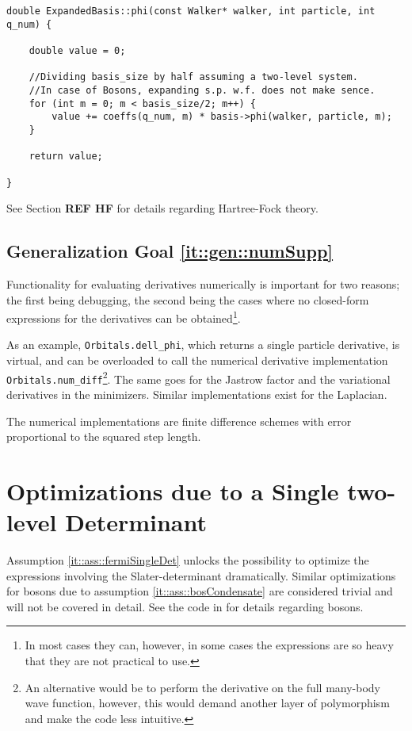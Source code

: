 \vspace{0.5cm}
\begin{lstlisting}
double ExpandedBasis::phi(const Walker* walker, int particle, int q_num) {

    double value = 0;
    
    //Dividing basis_size by half assuming a two-level system.
    //In case of Bosons, expanding s.p. w.f. does not make sence.
    for (int m = 0; m < basis_size/2; m++) {
        value += coeffs(q_num, m) * basis->phi(walker, particle, m);
    }

    return value;

}
\end{lstlisting}

See Section \textbf{REF HF} for details regarding Hartree-Fock theory.

\subsection{Generalization Goal \ref{it::gen::numSupp}}

Functionality for evaluating derivatives numerically is important for two reasons; the first being debugging, the second being the cases where no closed-form expressions for the derivatives can be obtained\footnote{In most cases they can, however, in some cases the expressions are so heavy that they are not practical to use.}.

As an example, \verb+Orbitals.dell_phi+, which returns a single particle derivative, is virtual, and can be overloaded to call the numerical derivative implementation \verb+Orbitals.num_diff+\footnote{An alternative would be to perform the derivative on the full many-body wave function, however, this would demand another layer of polymorphism and make the code less intuitive.}. The same goes for the Jastrow factor and the variational derivatives in the minimizers. Similar implementations exist for the Laplacian.

The numerical implementations are finite difference schemes with error proportional to the squared step length.

\section{Optimizations due to a Single two-level Determinant}
\label{sec:optSingleSlater}

Assumption \ref{it::ass::fermiSingleDet} unlocks the possibility to optimize the expressions involving the Slater-determinant dramatically. Similar optimizations for bosons due to assumption \ref{it::ass::bosCondensate} are considered trivial and will not be covered in detail. See the code in \cite{libBorealisCode} for details regarding bosons.


